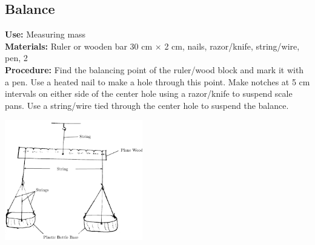 \begin{multicols}{2}


\section{Balance}
\label{sec:balance}
\vspace{-10pt}
\textbf{Use:} Measuring mass\\
\textbf{Materials:} Ruler or wooden bar 30 cm $\times$ 2 cm, nails, razor/knife, string/wire, pen, 2 \\
\textbf{Procedure:} Find the balancing point of the ruler/wood block and mark it with a pen. Use a heated nail to make a hole through this point. Make notches at 5 cm intervals on either side of the center hole using a razor/knife to suspend scale pans. Use a string/wire tied through the center hole to suspend the balance.
\begin{center}
\includegraphics[width=0.45\textwidth]{./img/beam-balance.png}
\end{center}


\end{multicols}

